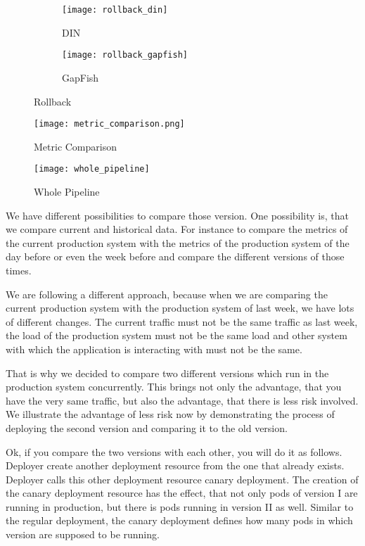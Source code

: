 \begin{figure}[htbp]
  \centering
  \begin{subfigure}{.5\textwidth}
    \texttt{[image: rollback\_din]}
    \caption[DIN]{DIN}
    \label{fig:rollback_din}
  \end{subfigure}%
  \begin{subfigure}{.5\textwidth}
    \texttt{[image: rollback\_gapfish]}
    \caption[GapFish]{GapFish}
    \label{fig:rollback_gapfish}
  \end{subfigure}
  \caption[Deploy]{Rollback}
\end{figure}

\begin{figure}[htbp]
  \centering
  \texttt{[image: metric\_comparison.png]}
  \caption[Metric Comparison]{Metric Comparison}
  \label{fig:metric_comparison}
\end{figure}

\begin{figure}[htbp]
  \centering
  \texttt{[image: whole\_pipeline]}
  \caption[Metric Comparison]{Whole Pipeline}
  \label{fig:whole pipeline}
\end{figure}

We have different possibilities to compare those version. One possibility is, that we
compare current and historical data. For instance to compare the metrics of the current
production system with the metrics of the production system of the day before or even the
week before and compare the different versions of those times.

We are following a different approach, because when we are comparing the current
production system with the production system of last week, we have lots of different
changes. The current traffic must not be the same traffic as last week, the load of the
production system must not be the same load and other system with which the application is
interacting with must not be the same.

That is why we decided to compare two different versions which run in the production
system concurrently. This brings not only the advantage, that you have the very same
traffic, but also the advantage, that there is less risk involved. We illustrate the
advantage of less risk now by demonstrating the process of deploying the second version
and comparing it to the old version.

Ok, if you compare the two versions with each other, you will do it as follows. Deployer
create another deployment resource from the one that already exists. Deployer calls this
other deployment resource canary deployment. The creation of the canary deployment
resource has the effect, that not only pods of version I are running in production, but
there is pods running in version II as well. Similar to the regular deployment, the canary
deployment defines how many pods in which version are supposed to be running.

